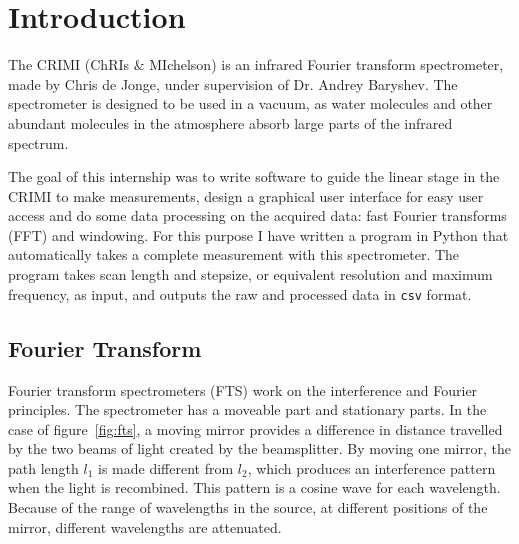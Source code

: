 
\section{Introduction}
The CRIMI (ChRIs $\&$ MIchelson) is an infrared Fourier transform spectrometer, made by Chris de Jonge, under supervision of Dr. Andrey Baryshev. The spectrometer is designed to be used in a vacuum, as water molecules and other abundant molecules in the atmosphere absorb large parts of the infrared spectrum.

The goal of this internship was to write software to guide the linear stage in the CRIMI to make measurements, design a graphical user interface for easy user access and do some data processing on the acquired data: fast Fourier transforms (FFT) and windowing. For this purpose I have written a program in Python that automatically takes a complete measurement with this spectrometer. The program takes scan length and stepsize, or equivalent resolution and maximum frequency, as input, and outputs the raw and processed data in \verb!csv! format.


\subsection{Fourier Transform}

Fourier transform spectrometers (FTS) work on the interference and Fourier principles. The spectrometer has a moveable part and stationary parts. In the case of figure~\ref{fig:fts}, a moving mirror provides a difference in distance travelled by the two beams of light created by the beamsplitter. By moving one mirror, the path length $l_1$ is made different from $l_2$, which produces an interference pattern when the light is recombined. This pattern is a cosine wave for each wavelength. Because of the range of wavelengths in the source, at different positions of the mirror, different wavelengths are attenuated.

